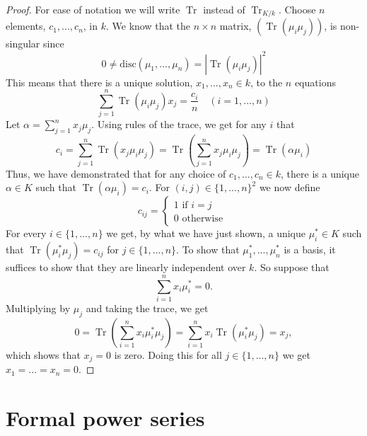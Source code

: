 \documentclass{article}
\DeclareMathOperator{\tr}{Tr}
\numberwithin{equation}{section}
\begin{document}
\begin{proof}
	For ease of notation we will write $\tr$ instead of $\tr_{K/k}$. Choose $n$ elements, $c_1, ..., c_n$, in $k$. We know that the $n \times n$ matrix, $(\tr (\mu_i \mu_j))$, is non-singular since $$0 \neq \text{disc}(\mu_1, ..., \mu_n) = |\tr(\mu_i \mu_j)|^2$$
	This means that there is a unique solution, $x_1, ..., x_n \in k$, to the $n$ equations
	$$\sum_{j=1}^n \tr(\mu_i \mu_j) x_j = \frac{c_i}{n} \quad (i = 1, ..., n)$$
	Let $\alpha = \sum_{j=1}^n x_j \mu_j$. Using rules of the trace, we get for any $i$ that
	$$c_i = \sum_{j=1}^n \tr(x_j \mu_i \mu_j) = \tr(\sum_{j=1}^n x_j \mu_i \mu_j) = \tr(\alpha \mu_i)$$
	Thus, we have demonstrated that for any choice of $c_1, ..., c_n \in k$, there is a unique $\alpha \in K$ such that $\tr(\alpha \mu_i)= c_i$. For $(i,j) \in \{1, ..., n\}^2$ we now define
	$$c_{ij} = \begin{cases*}
        	1 \text{ if } i = j \\
        	0 \text{ otherwise }
    	\end{cases*}$$
	For every $i \in \{1, ..., n \}$ we get, by what we have just shown, a unique $\mu_i^* \in K$ such that $\tr(\mu_i^* \mu_j) = c_{ij}$ for $j \in \{ 1, ..., n \}$. To show that $\mu_1^*, ..., \mu_n^*$ is a basis, it suffices to show that they are linearly independent over $k$. So suppose that
	$$\sum_{i=1}^n x_i \mu_i^* = 0.$$
	Multiplying by $\mu_j$ and taking the trace, we get
	$$0 = \tr(\sum_{i=1}^n x_i \mu_i^* \mu_j) = \sum_{i=1}^n x_i \tr(\mu_i^* \mu_j) = x_j,$$
	which shows that $x_j = 0$ is zero. Doing this for all $j \in \{1, ..., n \}$ we get $x_1 = ... = x_n = 0$.
\end{proof}



\section{Formal power series}\label{sec: Formal power series}
\end{document}

